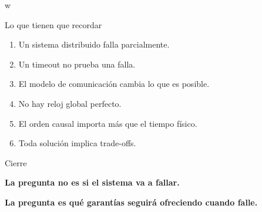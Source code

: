 w\documentclass[aspectratio=169]{beamer}
\begin{document}
\begin{frame}{Lo que tienen que recordar}

\Large

\begin{enumerate}
    \item Un sistema distribuido falla parcialmente.
    \item Un timeout no prueba una falla.
    \item El modelo de comunicación cambia lo que es posible.
    \item No hay reloj global perfecto.
    \item El orden causal importa más que el tiempo físico.
    \item Toda solución implica trade-offs.
\end{enumerate}

\end{frame}

\begin{frame}{Cierre}

\Large

\begin{center}
\textbf{La pregunta no es si el sistema va a fallar.}
\end{center}

\vspace{0.8cm}

\begin{center}
\textbf{La pregunta es qué garantías seguirá ofreciendo cuando falle.}
\end{center}

\end{frame}
\end{document}
